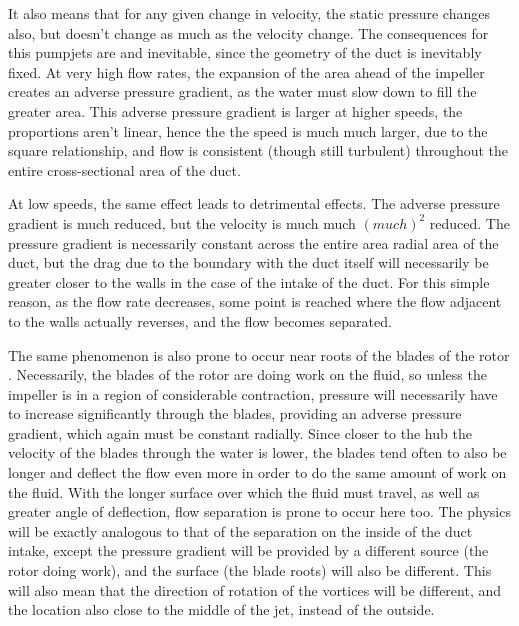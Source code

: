 \documentclass{article}\usepackage[]{graphicx}\usepackage[]{color}
\begin{document}
It also means that for any given change in velocity, the static pressure changes also, but doesn't change as much as the velocity change.  The consequences for this pumpjets are and inevitable, since the geometry of the duct is inevitably fixed.  At very high flow rates, the expansion of the area ahead of the impeller creates an adverse pressure gradient, as the water must slow down to fill the greater area.  This adverse pressure gradient is larger at higher speeds, the proportions aren't linear, hence the the speed is much much larger, due to the square relationship, and flow is consistent (though still turbulent) throughout the entire cross-sectional area of the duct.

At low speeds, the same effect leads to detrimental effects.  The adverse pressure gradient is much reduced, but the velocity is much much $(much)^2$ reduced. The pressure gradient is necessarily constant across the entire area radial area of the duct, but the drag due to the boundary with the duct itself will necessarily be greater closer to the walls in the case of the intake of the duct.  For this simple reason, as the flow rate decreases, some point is reached where the flow adjacent to the walls actually reverses, and the flow becomes separated.

The same phenomenon is also prone to occur near roots of the blades of the rotor \parencite[15]{henderson1964}.  Necessarily, the blades of the rotor are doing work on the fluid, so unless the impeller is in a region of considerable contraction, pressure will necessarily have to increase significantly through the blades, providing an adverse pressure gradient, which again must be constant radially.  Since closer to the hub the velocity of the blades through the water is lower, the blades tend often to also be longer and deflect the flow even more in order to do the same amount of work on the fluid. With the longer surface over which the fluid must travel, as well as greater angle of deflection, flow separation is prone to occur here too.  The physics will be exactly analogous to that of the separation on the inside of the duct intake, except the pressure gradient will be provided by a different source (the rotor doing work), and the surface (the blade roots) will also be different. This will also mean that the direction of rotation of the vortices will be different, and the location also close to the middle of the jet, instead of the outside.
\end{document}
